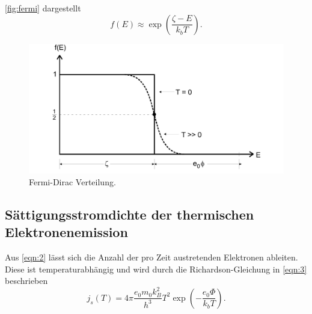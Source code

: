\autoref{fig:fermi} dargestellt
\begin{equation}
    \label{eqn:2}
    f\left(E\right) \approx \exp{\left(\frac{\zeta-E}{k_b T}\right)}.
\end{equation}
\begin{figure}[H]
    \centering
        \centering
        \includegraphics[width=\textwidth]{Bilder/Fermi-Dirac.jpg}
        \caption{Fermi-Dirac Verteilung. \cite{anleitung4}}
    \hfill
    \label{fig:fermi}
\end{figure}

\subsection{Sättigungsstromdichte der thermischen Elektronenemission}
Aus \autoref{eqn:2} lässt sich die Anzahl der pro Zeit austretenden Elektronen
ableiten. Diese ist temperaturabhängig und wird durch die Richardson-Gleichung
in \autoref{eqn:3} beschrieben
\begin{equation}
    \label{eqn:3}
    j_s \left(T\right) = 4\pi \frac{e_0m_0k_B^2}{h^3}T^2\exp{\left(-\frac{e_0\Phi}{k_b T}\right)}.
\end{equation}

